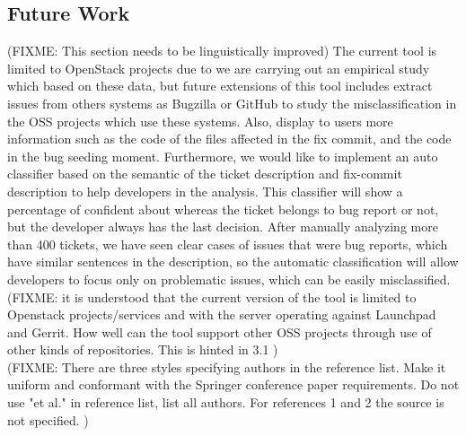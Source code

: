 \documentclass[ifip]{svmult}
\begin{document}
\subsection{Future Work}
\label{sec:5.1}


(FIXME: This section needs to be linguistically improved)
The current tool is limited to OpenStack projects due to we are carrying out an empirical study which based on these data, but future extensions of this tool includes extract issues from others systems as Bugzilla or GitHub to study the misclassification in the OSS projects which use these systems. Also, display to users more information such as the code of the files affected in the fix commit, and the code in the bug seeding moment. Furthermore, we would like to implement an auto classifier based on the semantic of the ticket description and fix-commit description to help developers in the analysis. This classifier will show a percentage of confident about whereas the ticket belongs to bug report or not, but the developer always has the last decision. After manually analyzing more than 400 tickets, we have seen clear cases of issues that were bug reports, which have similar sentences in the description, so the automatic classification will allow developers to focus only on problematic issues, which can be easily misclassified. \\
(FIXME: it is understood that the current version of the tool is limited to Openstack projects/services and with the server operating against Launchpad and Gerrit. How well can the tool support other OSS projects through use of other kinds of repositories. This is hinted in 3.1 )\\
(FIXME: There are three styles specifying authors in the reference list. Make it uniform and conformant with the Springer conference paper requirements. Do not use "et al." in reference list, list all authors. For references 1 and 2 the source is not specified.
)



\end{document}
